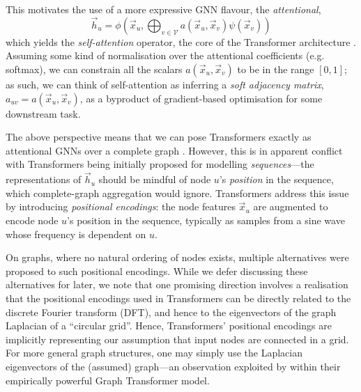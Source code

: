 This motivates the use of a more expressive GNN flavour, the {\em attentional}, 
\begin{equation}
    \vec{h}_u = \phi\left(\vec{x}_u, \bigoplus_{v\in \mathcal{V}} a(\vec{x}_u, \vec{x}_v)\psi(\vec{x}_v)\right)
\end{equation}
which yields the \emph{self-attention} operator, the core of the Transformer architecture \citep{vaswani2017attention}. Assuming some kind of normalisation over the attentional coefficients (e.g. softmax), we can constrain all the scalars $a(\vec{x}_u, \vec{x}_v)$ to be in the range $[0, 1]$; as such, we can think of self-attention as inferring a \emph{soft adjacency matrix}, $a_{uv} = a(\vec{x}_u, \vec{x}_v)$, as a byproduct of gradient-based optimisation for some downstream task.

The above perspective means that we can pose Transformers exactly as attentional GNNs over a complete graph \citep{joshi2020transformers}. However, this is in apparent conflict with Transformers being initially proposed for modelling \emph{sequences}---the representations of $\vec{h}_u$ should be mindful of node $u$'s \emph{position} in the sequence, which complete-graph aggregation would ignore. Transformers address this issue by introducing \emph{positional encodings}: the node features $\vec{x}_u$ are augmented to encode node $u$'s position in the sequence, typically as samples from a sine wave whose frequency is dependent on $u$. 

On graphs, where no natural ordering of nodes exists, multiple alternatives were proposed to such positional encodings. While we defer discussing these alternatives for later, we note that one promising direction involves a realisation that the positional encodings used in Transformers can be directly related to the discrete Fourier transform (DFT), and hence to the eigenvectors of the graph Laplacian of a ``circular grid''. Hence, Transformers' positional encodings are implicitly representing our assumption that input nodes are connected in a grid. For more general graph structures, one may simply use the Laplacian eigenvectors of the (assumed) graph---an observation exploited by \citet{dwivedi2020generalization} within their empirically powerful Graph Transformer model.


